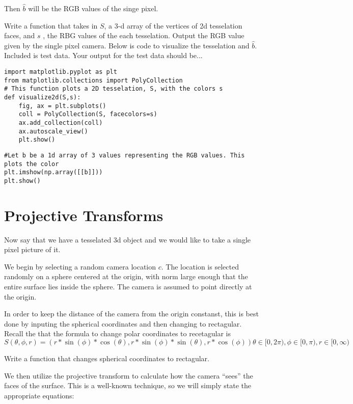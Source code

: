 Then $\hat{b}$ will be the RGB values of the singe pixel.

\begin{problem}
Write a function that takes in $S$, a 3-d array of the vertices of 2d tesselation faces, and $s$ , the RBG values of the each tesselation. Output the RGB value given by the single pixel camera. Below is code to visualize the tesselation and $\hat{b}$.  Included is test data. Your output for the test data should be...
\end{problem}

\begin{lstlisting}
import matplotlib.pyplot as plt
from matplotlib.collections import PolyCollection
# This function plots a 2D tesselation, S, with the colors s 
def visualize2d(S,s):
    fig, ax = plt.subplots()
    coll = PolyCollection(S, facecolors=s)
    ax.add_collection(coll)
    ax.autoscale_view()
    plt.show()
\end{lstlisting}
\begin{lstlisting}
#Let b be a 1d array of 3 values representing the RGB values. This plots the color
plt.imshow(np.array([[b]]))
plt.show()
\end{lstlisting}

\section*{Projective Transforms}
Now say that we have a tesselated 3d object and we would like to take a single pixel picture of it.

We begin by selecting a random camera location $c$. The location is selected randomly on a sphere centered at the origin, with norm large enough that the entire surface lies inside the sphere. The camera is assumed to point directly at the origin.

In order to keep the distance of the camera from the origin constanst, this is best done by inputing the spherical coordinates and then changing to rectagular. Recall the that the formula to change polar coordinates to recetagular is 
\[
S(\theta,\phi,r)=(r*\sin(\phi)*\cos(\theta),r*\sin(\phi)*\sin(\theta),r*\cos(\phi))
\theta \in [0,2\pi),\phi \in [0,\pi), r \in [0,\infty)
\]
\begin{problem}
Write a function that changes spherical coordinates to rectagular.
\end{problem}

We then utilize the projective transform to calculate how the camera ``sees'' the faces of the surface. This is a well-known technique, so we will simply state the appropriate equations:

